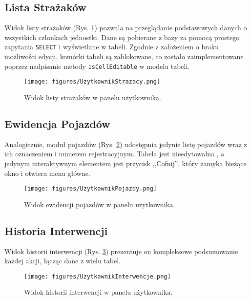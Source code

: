 \subsection{Lista Strażaków}
\label{ssec:uzytkownik_strazacy}

Widok listy strażaków (Rys. \ref{fig:uzytkownik_strazacy}) pozwala na przeglądanie podstawowych danych o wszystkich członkach jednostki. Dane są pobierane z bazy za pomocą prostego zapytania \texttt{SELECT}  i wyświetlane w tabeli. Zgodnie z założeniem o braku możliwości edycji, komórki tabeli są zablokowane, co zostało zaimplementowane poprzez nadpisanie metody \texttt{isCellEditable} w modelu tabeli.

\begin{figure}[H]
	\centering
	\texttt{[image: figures/UzytkownikStrazacy.png]}
	\caption{Widok listy strażaków w panelu użytkownika.}
	\label{fig:uzytkownik_strazacy}
\end{figure}

\subsection{Ewidencja Pojazdów}
\label{ssec:uzytkownik_pojazdy}

Analogicznie, moduł pojazdów (Rys. \ref{fig:uzytkownik_pojazdy}) udostępnia jedynie listę pojazdów wraz z ich oznaczeniem i numerem rejestracyjnym. Tabela jest nieedytowalna , a jedynym interaktywnym elementem jest przycisk ,,Cofnij'', który zamyka bieżące okno i otwiera menu główne.

\begin{figure}[H]
	\centering
	\texttt{[image: figures/UzytkownikPojazdy.png]}
	\caption{Widok ewidencji pojazdów w panelu użytkownika.}
	\label{fig:uzytkownik_pojazdy}
\end{figure}

\subsection{Historia Interwencji}
\label{ssec:uzytkownik_interwencje}

Widok historii interwencji (Rys. \ref{fig:uzytkownik_interwencje}) prezentuje on kompleksowe podsumowanie każdej akcji, łącząc dane z wielu tabel.

\begin{figure}[H]
	\centering
	\texttt{[image: figures/UzytkownikInterwencje.png]}
	\caption{Widok historii interwencji w panelu użytkownika.}
	\label{fig:uzytkownik_interwencje}
\end{figure}

